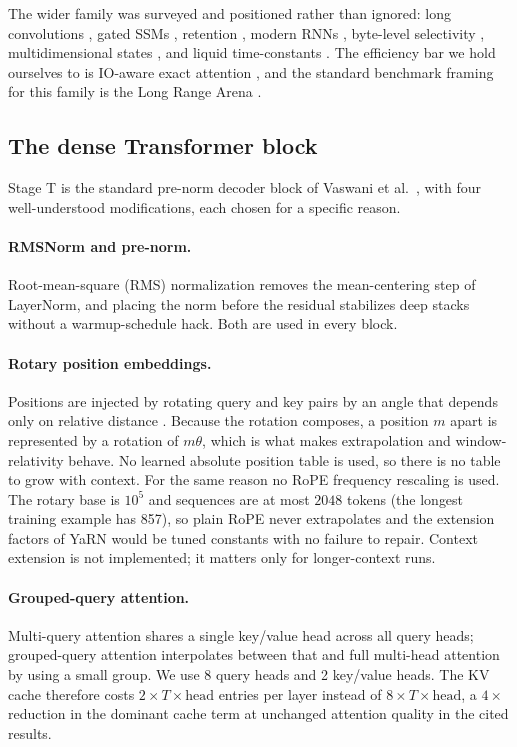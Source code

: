 \documentclass[11pt,a4paper]{article}
\newcommand{\Tdim}{T}
\newcommand{\hd}{\mathrm{head}}
\theoremstyle{plain}
\theoremstyle{definition}
\theoremstyle{remark}
\begin{document}
\noindent
The wider family was surveyed and positioned rather than ignored: long
convolutions \cite{poli2023hyena}, gated SSMs \cite{fu2022h3}, retention
\cite{sun2023retnet}, modern RNNs \cite{peng2023rwkv,de2024griffin,beck2024xlstm},
byte-level selectivity \cite{wang2024mambabyte}, multidimensional states
\cite{nguyen2022s4nd}, and liquid time-constants \cite{hasani2022liquid}. The
efficiency bar we hold ourselves to is IO-aware exact attention
\cite{dao2022flashattn}, and the standard benchmark framing for this family is
the Long Range Arena \cite{tay2020lra}.

\subsection{The dense Transformer block}

\noindent
Stage T is the standard pre-norm decoder block of Vaswani et al.~\cite{vaswani2017},
with four well-understood modifications, each chosen for a specific reason.

\paragraph{RMSNorm and pre-norm.}
Root-mean-square (RMS) normalization \cite{zhang2019rmsnorm} removes the
mean-centering step of LayerNorm, and placing the norm before the residual
\cite{xiong2020prenorm} stabilizes deep stacks without a warmup-schedule hack.
Both are used in every block.

\paragraph{Rotary position embeddings.}
Positions are injected by rotating query and key pairs by an angle that
depends only on relative distance \cite{su2021rope}. Because the rotation
composes, a position $m$ apart is represented by a rotation of $m\theta$,
which is what makes extrapolation and window-relativity behave. No learned
absolute position table is used, so there is no table to grow with context.
For the same reason no RoPE frequency rescaling is used. The rotary base is
$10^5$ and sequences are at most $2048$ tokens (the longest training example
has 857), so plain RoPE never extrapolates and the extension factors of YaRN
\cite{peng2023yarn} would be tuned constants with no failure to repair.
Context extension is not implemented; it matters only for longer-context runs.

\paragraph{Grouped-query attention.}
Multi-query attention \cite{shazeer2019mqa} shares a single key/value head
across all query heads; grouped-query attention \cite{ainslie2023gqa}
interpolates between that and full multi-head attention by using a small
group. We use 8 query heads and 2 key/value heads. The KV cache therefore
costs $2 \times \Tdim \times \hd$ entries per layer instead of
$8 \times \Tdim \times \hd$, a $4\times$ reduction in the dominant cache term
at unchanged attention quality in the cited results.
\end{document}
